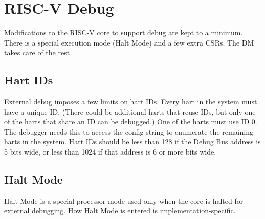 \documentclass{article}
\begin{document}
%
%

\section{RISC-V Debug}

Modifications to the RISC-V core to support debug are kept to a minimum.  There
is a special execution mode (Halt Mode) and a few extra CSRs. The DM takes care
of the rest.

\subsection{Hart IDs} \label{hartids}

External debug imposes a few limits on hart IDs. Every hart in the system must
have a unique ID. (There could be additional harts that reuse IDs, but only one
of the harts that share an ID can be debugged.) One of the harts must use ID 0.
The debugger needs this to access the config string to enumerate the remaining
harts in the system. Hart IDs should be less than 128 if the Debug Bus address
is 5 bits wide, or less than 1024 if that address is 6 or more bits wide.

\subsection{Halt Mode} \label{haltmode}

Halt Mode is a special processor mode used only when the core is halted for
external debugging. How Halt Mode is entered is implementation-specific.
\end{document}
